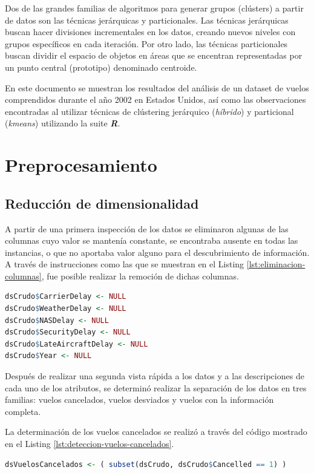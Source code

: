 \documentclass[12pt]{article}
\numberwithin{equation}{section}
\numberwithin{table}{section}
\numberwithin{figure}{section}
\begin{document}
Dos de las grandes familias de algoritmos para generar grupos (clústers) a partir de datos son las técnicas jerárquicas y particionales. 
Las técnicas jerárquicas buscan hacer divisiones incrementales en los datos, creando nuevos niveles con grupos específicos en cada iteración.
Por otro lado, las técnicas particionales buscan dividir el espacio de objetos en áreas que se encentran representadas por un punto central (prototipo) denominado centroide.

En este documento se muestran los resultados del análisis de un dataset de vuelos comprendidos durante el año 2002 en Estados Unidos, así como las observaciones encontradas al utilizar técnicas de clústering jerárquico (\emph{híbrido}) y particional (\emph{kmeans}) utilizando la suite \emph{\textbf{R}}.

\section{Preprocesamiento}
\subsection{Reducción de dimensionalidad}
A partir de una primera inspección de los datos se eliminaron algunas de las columnas cuyo valor se mantenía constante, se encontraba ausente en todas las instancias, o que no aportaba valor alguno para el descubrimiento de información. 
A través de instrucciones como las que se muestran en el Listing \ref{lst:eliminacion-columnas}, fue posible realizar la remoción de dichas columnas.

\begin{lstlisting}[language=R, caption=Eliminación de columnas con valores constantes, label={lst:eliminacion-columnas},]
dsCrudo$CarrierDelay <- NULL
dsCrudo$WeatherDelay <- NULL
dsCrudo$NASDelay <- NULL
dsCrudo$SecurityDelay <- NULL
dsCrudo$LateAircraftDelay <- NULL
dsCrudo$Year <- NULL
\end{lstlisting}


Después de realizar una segunda vista rápida a los datos y a las descripciones de cada uno de los atributos, se determinó realizar la separación de los datos en tres familias: vuelos cancelados, vuelos desviados y vuelos con la información completa.

La determinación de los vuelos cancelados se realizó a través del código mostrado en el Listing \ref{lst:deteccion-vuelos-cancelados}.
\begin{lstlisting}[language=R, caption=Detección de vuelos cancelados, label={lst:deteccion-vuelos-cancelados}]
dsVuelosCancelados <- ( subset(dsCrudo, dsCrudo$Cancelled == 1) )
\end{lstlisting}
\end{document}
